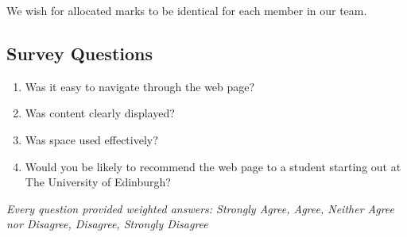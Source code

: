 \documentclass[a4paper, notoc]{tufte-handout}
\begin{document}
We wish for allocated marks to be identical for each member in our team.

\newpage

\begin{appendix}
\section{Survey Questions}
\begin{enumerate}
\item Was it easy to navigate through the web page?
\item Was content clearly displayed?
\item Was space used effectively?
\item Would you be likely to recommend the web page to a student starting out at The University of Edinburgh?
\end{enumerate}

\textit{Every question provided weighted answers: Strongly Agree, Agree, Neither Agree nor Disagree, Disagree, Strongly Disagree}
\end{appendix}
\end{document}
